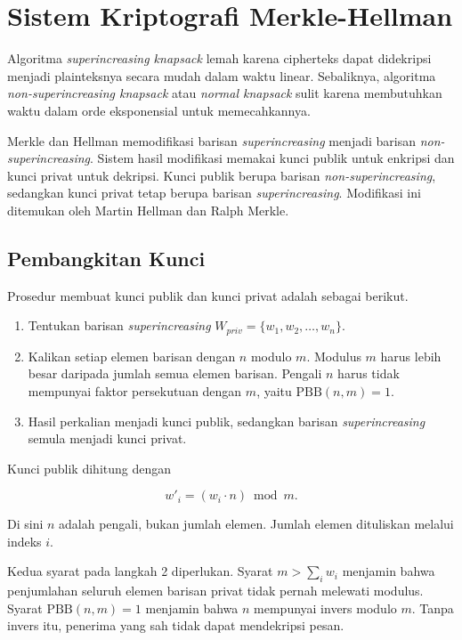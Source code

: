 \section{Sistem Kriptografi Merkle-Hellman}
\label{sec:merkle-hellman}

Algoritma \textit{superincreasing knapsack} lemah karena cipherteks dapat
didekripsi menjadi plainteksnya secara mudah dalam waktu linear. Sebaliknya,
algoritma \textit{non-superincreasing knapsack} atau \textit{normal knapsack}
sulit karena membutuhkan waktu dalam orde eksponensial untuk memecahkannya.

Merkle dan Hellman memodifikasi barisan \textit{superincreasing} menjadi barisan
\textit{non-superincreasing}. Sistem hasil modifikasi memakai kunci publik untuk
enkripsi dan kunci privat untuk dekripsi. Kunci publik berupa barisan
\textit{non-superincreasing}, sedangkan kunci privat tetap berupa barisan
\textit{superincreasing}. Modifikasi ini ditemukan oleh Martin Hellman dan
Ralph Merkle.

\subsection{Pembangkitan Kunci}

Prosedur membuat kunci publik dan kunci privat adalah sebagai berikut.

\begin{enumerate}
    \item Tentukan barisan \textit{superincreasing}
          $W_{priv} = \{w_1, w_2, \dots, w_n\}$.
    \item Kalikan setiap elemen barisan dengan $n$ modulo $m$. Modulus $m$
          harus lebih besar daripada jumlah semua elemen barisan. Pengali $n$
          harus tidak mempunyai faktor persekutuan dengan $m$, yaitu
          $\text{PBB}(n, m) = 1$.
    \item Hasil perkalian menjadi kunci publik, sedangkan barisan
          \textit{superincreasing} semula menjadi kunci privat.
\end{enumerate}

Kunci publik dihitung dengan

\begin{equation}
w'_i = (w_i \cdot n) \bmod m .
\label{eq:mh-kunci}
\end{equation}

Di sini $n$ adalah pengali, bukan jumlah elemen. Jumlah elemen dituliskan
melalui indeks $i$.

Kedua syarat pada langkah 2 diperlukan. Syarat $m > \sum_i w_i$ menjamin bahwa
penjumlahan seluruh elemen barisan privat tidak pernah melewati modulus. Syarat
$\text{PBB}(n, m) = 1$ menjamin bahwa $n$ mempunyai invers modulo $m$. Tanpa
invers itu, penerima yang sah tidak dapat mendekripsi pesan.

